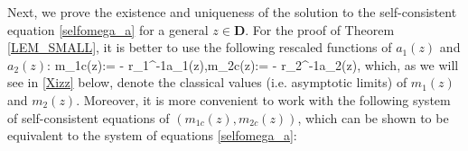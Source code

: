 \documentclass[aos,preprint]{imsart}
\begin{document}

Next, we prove the existence and uniqueness of the solution to the self-consistent equation \eqref{selfomega_a} for a general $z\in \mathbf D$. For the proof of Theorem \ref{LEM_SMALL}, it is better to use the following rescaled functions of $a_1(z)$ and $a_2(z)$:
\be\label{M1M2a1a2}
m_{1c}(z):= - r_1^{-1}a_1(z),\quad m_{2c}(z):= - r_2^{-1}a_2(z),
\ee
which, as we will see in \eqref{Xizz} below, denote the classical values (i.e. asymptotic limits) of $m_1(z)$ and $m_2(z)$.
Moreover, it is more convenient to work with the following system of self-consistent equations of $(m_{1c}(z),m_{2c}(z))$, which can be shown to be equivalent to the system of equations \eqref{selfomega_a}:
\end{document}
